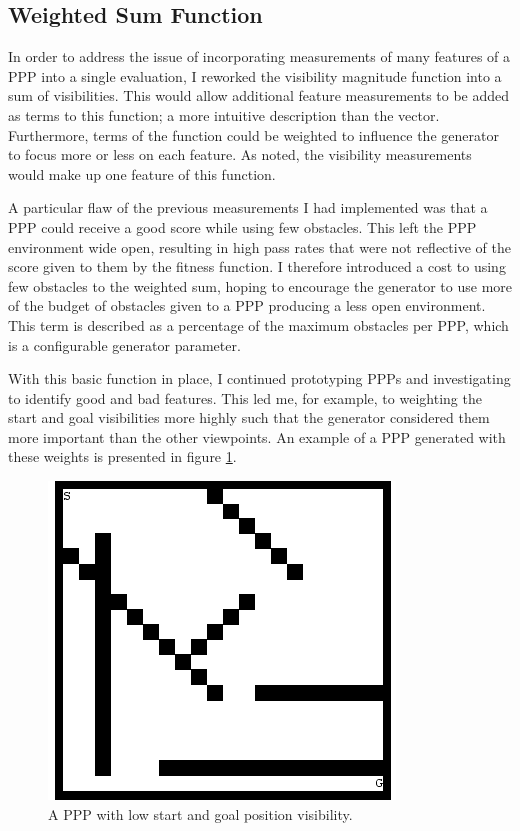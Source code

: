 \documentclass[authoryearcitations]{UoYCSproject}
\begin{document}
\subsection{Weighted Sum Function}
\label{sec:weighted_sum}
In order to address the issue of incorporating measurements of many features of a PPP into a single evaluation, I reworked the visibility magnitude function into a sum of visibilities. This would allow additional feature measurements to be added as terms to this function; a more intuitive description than the vector. Furthermore, terms of the function could be weighted to influence the generator to focus more or less on each feature. As noted, the visibility measurements would make up one feature of this function.

A particular flaw of the previous measurements I had implemented was that a PPP could receive a good score while using few obstacles. This left the PPP environment wide open, resulting in high pass rates that were not reflective of the score given to them by the fitness function. I therefore introduced a cost to using few obstacles to the weighted sum, hoping to encourage the generator to use more of the budget of obstacles given to a PPP producing a less open environment. This term is described as a percentage of the maximum obstacles per PPP, which is a configurable generator parameter.

With this basic function in place, I continued prototyping PPPs and investigating to identify good and bad features. This led me, for example, to weighting the start and goal visibilities more highly such that the generator considered them more important than the other viewpoints. An example of a PPP generated with these weights is presented in figure \ref{fig:weighted_sum_ppp}.

\begin{figure}
\graphicspath{ {DesignImpPics/} }
\includegraphics[scale=0.65]{goalStartVis.png}
\caption{A PPP with low start and goal position visibility.}
\label{fig:weighted_sum_ppp}
\end{figure}
\end{document}
